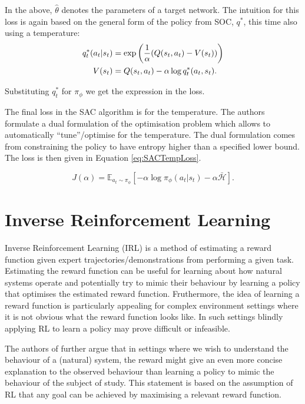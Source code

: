 \documentclass{report}
\numberwithin{equation}{section}
\numberwithin{figure}{section}
\numberwithin{table}{section}
\numberwithin{algorithm}{section}
\begin{document}
In the above, $\hat{\theta}$ denotes the parameters of a target 
network. The intuition for this loss is again based on the 
general form of the policy from SOC, $q^*$, this time also using 
a temperature:
\begin{align}
  q_t^*(a_t|s_t)&=\exp\left(
    \frac{1}{\alpha}(Q(s_t,a_t) - V(s_t))
  \right)\notag\\
  V(s_t)&=Q(s_t,a_t) - \alpha \log q_t^*(a_t,s_t).
\end{align}

Substituting $q^*_t$ for $\pi_\phi$ we get the expression in the 
loss.

The final loss in the SAC algorithm is for the temperature. 
The authors formulate a dual formulation of the optimisation 
problem which allows to automatically ``tune''/optimise for 
the temperature. The dual formulation comes from constraining 
the policy to have entropy higher than a specified lower bound.
The loss is then given in Equation \ref{eq:SACTempLoss}.

\begin{equation}\label{eq:SACTempLoss}
  J(\alpha)=\mathbb{E}_{a_t\sim \pi_\phi}[-\alpha \log \pi_\phi(a_t|s_t) - \alpha \bar{\mathcal{H}}].
\end{equation}


\chapter{Inverse Reinforcement Learning}\label{chap:IRL}
Inverse Reinforcement Learning (IRL) is a method of estimating 
a reward function given expert trajectories/demonstrations 
from performing a given task. Estimating the reward function can be 
useful for learning about how natural systems operate and potentially 
try to mimic their behaviour by learning a policy that 
optimises the 
estimated reward function. Fruthermore, the idea of learning a 
reward function 
is particularly appealing for complex environment settings 
where it is not obvious what the reward function looks like. 
In such settings blindly applying RL to learn a policy may 
prove difficult or infeasible. 


The authors of \cite{NgIRL} 
further argue that in settings where we wish to understand 
the behaviour of a (natural) system, the reward might give an even 
more concise explanation to the observed behaviour 
than learning a policy to mimic the behaviour of the subject 
of study. This statement is based on the assumption 
of RL that any goal can be achieved by maximising a relevant reward 
function.
\end{document}
